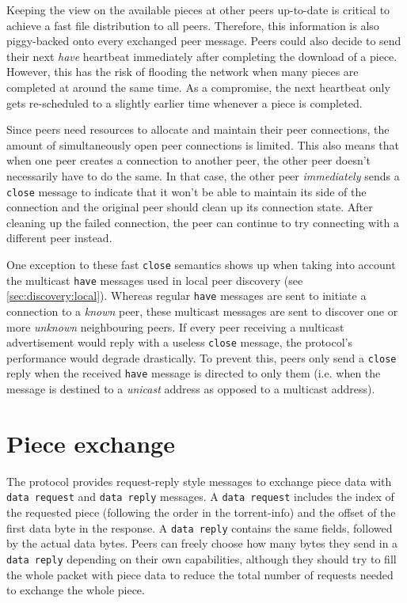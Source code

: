 Keeping the view on the available pieces at other peers up-to-date is critical to achieve a fast file distribution to all peers. Therefore, this information is also piggy-backed onto every exchanged peer message. Peers could also decide to send their next \emph{have} heartbeat immediately after completing the download of a piece. However, this has the risk of flooding the network when many pieces are completed at around the same time. As a compromise, the next heartbeat only gets re-scheduled to a slightly earlier time whenever a piece is completed.

Since peers need resources to allocate and maintain their peer connections, the amount of simultaneously open peer connections is limited. This also means that when one peer creates a connection to another peer, the other peer doesn't necessarily have to do the same. In that case, the other peer \emph{immediately} sends a \texttt{close} message to indicate that it won't be able to maintain its side of the connection and the original peer should clean up its connection state. After cleaning up the failed connection, the peer can continue to try connecting with a different peer instead.

One exception to these fast \texttt{close} semantics shows up when taking into account the multicast \texttt{have} messages used in local peer discovery (see \ref{sec:discovery:local}). Whereas regular \texttt{have} messages are sent to initiate a connection to a \emph{known} peer, these multicast messages are sent to discover one or more \emph{unknown} neighbouring peers. If every peer receiving a multicast advertisement would reply with a useless \texttt{close} message, the protocol's performance would degrade drastically. To prevent this, peers only send a \texttt{close} reply when the received \texttt{have} message is directed to only them (i.e. when the message is destined to a \emph{unicast} address as opposed to a multicast address).

\section{Piece exchange}
\label{sec:distrib:exchange}
The protocol provides request-reply style messages to exchange piece data with \texttt{data request} and \texttt{data reply} messages. A \texttt{data request} includes the index of the requested piece (following the order in the \gls{torrent-info}) and the offset of the first data byte in the response. A \texttt{data reply} contains the same fields, followed by the actual data bytes. Peers can freely choose how many bytes they send in a \texttt{data reply} depending on their own capabilities, although they should try to fill the whole packet with piece data to reduce the total number of requests needed to exchange the whole piece.

